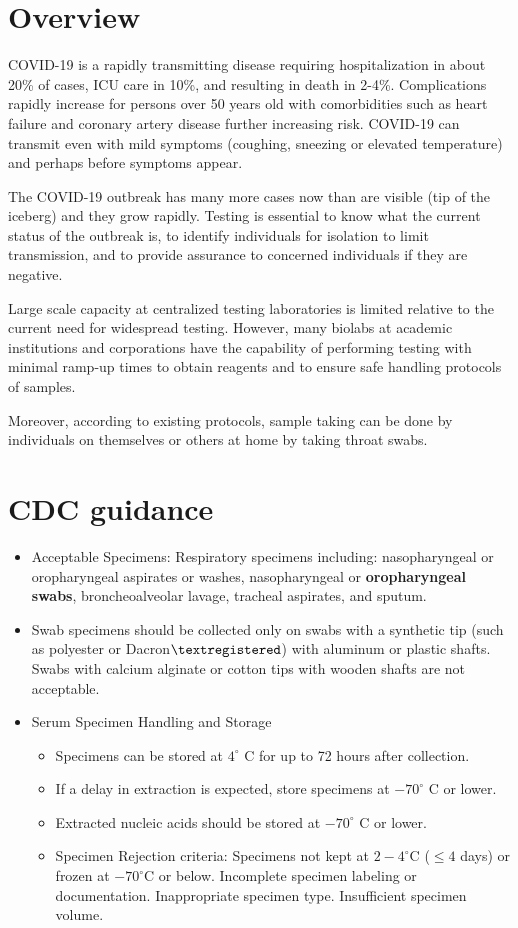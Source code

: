 \documentclass[onecolumn,journal]{IEEEtran}
\begin{document}
\section{Overview}
 COVID-19 is a rapidly transmitting disease requiring hospitalization in about 20\% of cases, ICU care in 10\%, and resulting in death in 2-4\%. Complications rapidly increase for persons over 50 years old with comorbidities such as heart failure and coronary artery disease further increasing risk. COVID-19 can transmit even with mild symptoms (coughing, sneezing or elevated temperature) and perhaps before symptoms appear. 
 
The COVID-19 outbreak has many more cases now than are visible (tip of the iceberg) and they grow rapidly. Testing is essential to know what the current status of the outbreak is, to identify individuals for isolation to limit transmission, and to provide assurance to concerned individuals if they are negative.  

Large scale capacity at centralized testing laboratories is limited relative to the current need for widespread testing. However, many biolabs at academic institutions and corporations have the capability of performing testing with minimal ramp-up times to obtain reagents and to ensure safe handling protocols of samples. 

Moreover, according to existing protocols, sample taking can be done by individuals on themselves or others at home by taking throat swabs. 

\section{CDC guidance} 
\begin{itemize}
\item Acceptable Specimens: Respiratory specimens including: nasopharyngeal or oropharyngeal aspirates or washes, nasopharyngeal or \textbf{oropharyngeal swabs}, broncheoalveolar lavage, tracheal aspirates, and sputum. 
\item Swab specimens should be collected only on swabs with a synthetic tip (such as polyester or Dacron$\textregistered$) with aluminum or plastic shafts. Swabs with calcium alginate or cotton tips with wooden shafts are not acceptable. 
\item Serum Specimen Handling and Storage 
\begin{itemize}
\item Specimens can be stored at $4^\circ$ C for up to 72 hours after collection. 
\item If a delay in extraction is expected, store specimens at $-70^\circ$ C or lower. 
\item Extracted nucleic acids should be stored at $-70^\circ$ C or lower. 
\item Specimen Rejection criteria: Specimens not kept at $2-4^\circ$C ($\le 4$ days) or frozen at $-70^\circ$C or below. Incomplete specimen labeling or documentation. Inappropriate specimen type. Insufficient specimen volume.
\end{itemize}
\end{itemize}
\end{document}
